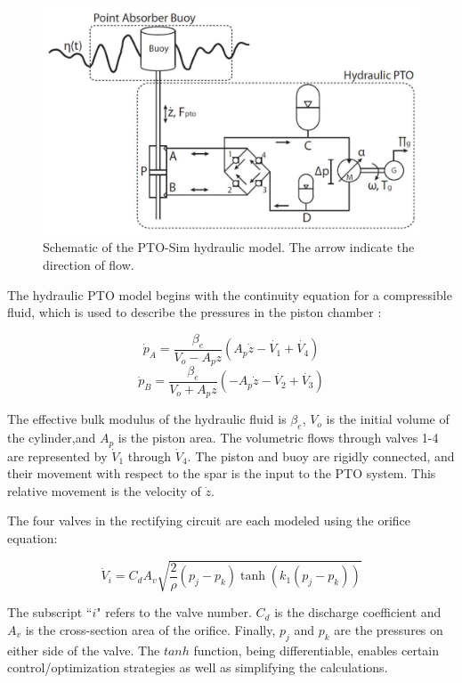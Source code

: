 \documentclass[twocolumn,10pt]{asme2e}
\begin{document}
\begin{figure}[t]
    \centering
    \includegraphics[width=1\columnwidth]{Images/HydraulicPTO}
    \caption{Schematic of the PTO-Sim hydraulic model. The arrow indicate the direction of flow.}
    \label{HydPTO}
    \end{figure}

The hydraulic PTO model begins with the continuity equation for a compressible fluid, which is used to describe the pressures in the piston chamber \cite{merritthydraulic}:

\begin{equation}
\dot{p}_A=\frac{\beta_e}{V_o-A_pz}(A_p\dot{z}-\dot{V_1}+\dot{V_4}) 
\end{equation}
\begin{equation}
\dot{p}_B=\frac{\beta_e}{V_o+A_pz}(-A_p\dot{z}-\dot{V_2}+\dot{V_3}) 
\end{equation}

The effective bulk modulus of the hydraulic fluid is $\beta_e$, $V_o$ is the initial volume of the cylinder,and $A_p$ is the piston area. The volumetric flows through valves 1-4 are represented by $\dot{V}_1$ through $\dot{V}_4$. The piston and buoy are rigidly connected, and their movement with respect to the spar is the input to the 
PTO system. This relative movement is the velocity of $\dot{z}$.

The four valves in the rectifying circuit are each modeled using the orifice equation: 

\begin{equation}
\dot{V}_i=C_dA_v \sqrt{\frac{2}{\rho}(p_j-p_k)\tanh(k_1(p_j-p_k))}  
\end{equation}

The subscript ``$i$" refers to the valve number. $C_d$ is the discharge coefficient and $A_v$ is the cross-section area of the orifice. Finally, $p_j$ and $p_k$ are the pressures on either side of the valve. The $tanh$ function, being differentiable, enables certain  control/optimization strategies as well as simplifying
the calculations. 
\end{document}
